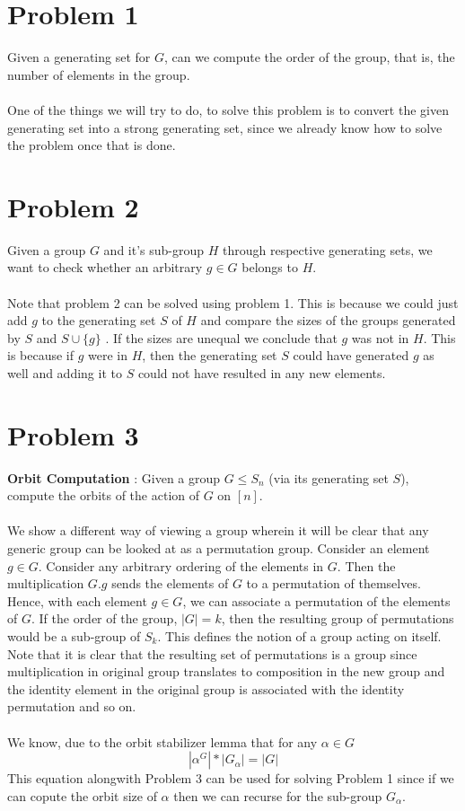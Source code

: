 \section{Problem 1}
Given a generating set for $G$, can we compute the order of the group, that is, the number of elements in the group.\\\\
One of the things we will try to do, to solve this problem is to convert the given generating set into a strong generating set, since we already know how to solve the problem once that is done.
\section{Problem 2}

Given a group $G$ and it's sub-group $H$ through respective generating sets, we want to check whether an arbitrary $g \in G$ belongs to $H$.\\\\
Note that problem 2 can be solved using problem 1. This is because we could just add $g$ to the generating set $S$ of $H$ and compare the sizes of the groups generated by $S$ and $S \cup \{g\}$  . If the sizes are unequal we conclude that $g$ was not in $H$. This is because if $g$ were in $H$, then the generating set $S$ could have generated $g$ as well and adding it to $S$ could not have resulted in any new elements. 
\section{Problem 3}
{\bf Orbit Computation} : Given a group $G \le S_{n}$ (via its generating set $S$), compute the orbits of the action of $G$ on $[n]$.\\\\
We show a different way of viewing a group wherein it will be clear that any generic group can be looked at as a permutation group. Consider an element $g \in G$. Consider any arbitrary ordering of the elements in $G$. Then the multiplication $G.g$ sends the elements of $G$ to a permutation of themselves. Hence, with each element 
$g \in G$, we can associate a permutation of the elements of $G$. If the order of the group, $|G| = k$, then the resulting group of permutations would be a sub-group of $S_{k}$. This defines the notion of a group acting on itself. Note that it is clear that the resulting set of permutations is a group since multiplication in original group translates to composition in the new group and the identity element in the original group is associated with the identity permutation and so on.\\\\
We know, due to the orbit stabilizer lemma that for any $\alpha \in  G$
$$|\alpha ^{G}|*|G_{\alpha}| = |G|$$
This equation alongwith Problem 3 can be used for solving Problem 1 since if we can copute the orbit size of $\alpha$ then we can recurse for the sub-group $G_{\alpha}$. 
